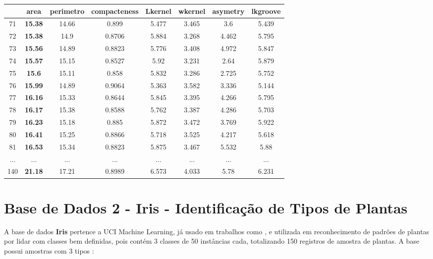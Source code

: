 \begin{table}[!ht]
{\begin{tabular}{|c|c|c|c|c|c|c|c|}
& \textbf{area} & \textbf{perimetro} & compacteness & Lkernel & wkernel & asymetry &lkgroove \\ \hline
\rowcolor[HTML]{EFEFEF} 
71 & \textbf{15.38} & 14.66 & 0.899 & 5.477 & 3.465 & 3.6 & 5.439\\ \hline 
\rowcolor[HTML]{EFEFEF}
72 & \textbf{15.38} & 14.9 & 0.8706 & 5.884 & 3.268 & 4.462 & 5.795\\ \hline 
\rowcolor[HTML]{EFEFEF}
73 & \textbf{15.56} & 14.89 & 0.8823 & 5.776 & 3.408 & 4.972 & 5.847\\ \hline 
\rowcolor[HTML]{EFEFEF}
74 & \textbf{15.57} & 15.15 & 0.8527 & 5.92 & 3.231 & 2.64 & 5.879\\ \hline 
\rowcolor[HTML]{EFEFEF}
75 & \textbf{15.6} & 15.11 & 0.858 & 5.832 & 3.286 & 2.725 & 5.752\\ \hline 
\rowcolor[HTML]{EFEFEF}
76 & \textbf{15.99} & 14.89 & 0.9064 & 5.363 & 3.582 & 3.336 & 5.144\\ \hline 
77 & \textbf{16.16} & 15.33 & 0.8644 & 5.845 & 3.395 & 4.266 & 5.795\\ \hline 
78 & \textbf{16.17} & 15.38 & 0.8588 & 5.762 & 3.387 & 4.286 & 5.703\\ \hline 
\rowcolor[HTML]{EFEFEF}
79 & \textbf{16.23} & 15.18 & 0.885 & 5.872 & 3.472 & 3.769 & 5.922\\ \hline 
80 & \textbf{16.41} & 15.25 & 0.8866 & 5.718 & 3.525 & 4.217 & 5.618\\ \hline 
81 & \textbf{16.53} & 15.34 & 0.8823 & 5.875 & 3.467 & 5.532 & 5.88\\ \hline 
...& ... & ... & ... & ... & ... & ... & ...\\ \hline 
140 & \textbf{21.18} & 17.21 & 0.8989 & 6.573 & 4.033 & 5.78 & 6.231\\ \hline 

\end{tabular}
    }
    
 \label{tab:analise:seeds:cluster2}
\end{table}




\section{Base de Dados 2 - Iris - Identificação de Tipos de Plantas}


A base de dados \textbf{Iris} pertence a UCI Machine Learning, já usado em trabalhos como , e utilizada em reconhecimento de padrões de plantas por lidar com classes bem definidas, pois contém 3 classes de 50 instâncias cada, totalizando  150 registros de amostra de plantas. A base possui amostras com 3 tipos \cite{FISHER1936}:

